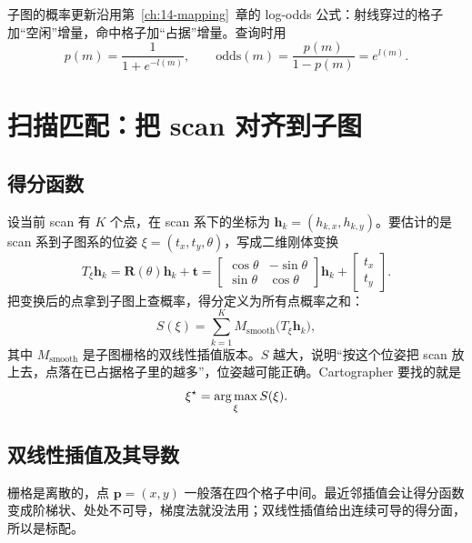 子图的概率更新沿用第~\ref{ch:14-mapping}~章的 log-odds 公式：射线穿过的格子加``空闲''增量，命中格子加``占据''增量。查询时用
\begin{equation}
p(m)=\frac{1}{1+e^{-l(m)}},\qquad \mathrm{odds}(m)=\frac{p(m)}{1-p(m)}=e^{l(m)} .
\end{equation}

\section{扫描匹配：把 scan 对齐到子图}\label{sec:15-match}

\subsection{得分函数}

设当前 scan 有 $K$ 个点，在 scan 系下的坐标为 $\bm{h}_k=(h_{k,x},h_{k,y})$。要估计的是 scan 系到子图系的位姿 $\xi=(t_x,t_y,\theta)$，写成二维刚体变换
\begin{equation}
T_\xi\bm{h}_k=\bm{R}(\theta)\bm{h}_k+\bm{t}
=\begin{bmatrix}\cos\theta&-\sin\theta\\ \sin\theta&\cos\theta\end{bmatrix}\bm{h}_k+\begin{bmatrix}t_x\\ t_y\end{bmatrix}.
\end{equation}
把变换后的点拿到子图上查概率，得分定义为所有点概率之和：
\begin{equation}
S(\xi)=\sum_{k=1}^{K}M_{\mathrm{smooth}}\big(T_\xi\bm{h}_k\big),
\label{eq:15-score}
\end{equation}
其中 $M_{\mathrm{smooth}}$ 是子图栅格的双线性插值版本。$S$ 越大，说明``按这个位姿把 scan 放上去，点落在已占据格子里的越多''，位姿越可能正确。Cartographer 要找的就是
\begin{equation}
\xi^{\star}=\operatorname*{arg\,max}_{\xi} S(\xi).
\label{eq:15-argmax}
\end{equation}

\subsection{双线性插值及其导数}

栅格是离散的，点 $\bm{p}=(x,y)$ 一般落在四个格子中间。最近邻插值会让得分函数变成阶梯状、处处不可导，梯度法就没法用；双线性插值给出连续可导的得分面，所以是标配。


